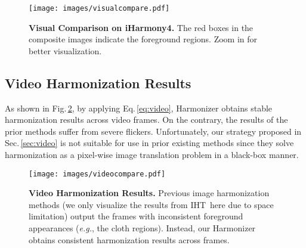\documentclass[runningheads]{llncs}
\begin{document}
 \begin{figure}[t]
\centering
\texttt{[image: images/visualcompare.pdf]}
{\begin{center}
\vspace{-0.5cm}
\caption{\textbf{Visual Comparison on iHarmony4.} The red boxes in the composite images indicate the foreground regions. Zoom in for better visualization.}
\label{fig:visual}
\end{center}
}
\vspace{-0.7cm}
\end{figure}





\subsection{Video Harmonization Results}\label{sec:4_2}

As shown in Fig.\,\ref{fig:video}, by applying Eq.\,\ref{eq:video}, 
Harmonizer obtains stable harmonization results across video frames.
On the contrary, the results of the prior methods suffer from severe flickers. Unfortunately, our strategy proposed in Sec.\,\ref{sec:video} is not suitable for use in prior existing methods since they solve harmonization as a pixel-wise image translation problem in a black-box manner. 




 \begin{figure}[t]
\centering
\texttt{[image: images/videocompare.pdf]}
{\begin{center}
\vspace{-0.5cm}
\caption{\textbf{Video Harmonization Results.} Previous image harmonization methods (we only visualize the results from IHT\,\cite{TransformerIH} here due to space limitation) output the frames with inconsistent foreground appearances ({\it e.g.}, the cloth regions). Instead, our Harmonizer obtains consistent harmonization results across frames.
}
\label{fig:video}
\end{center}
}
\vspace{-0.5cm}
\end{figure}
\end{document}
